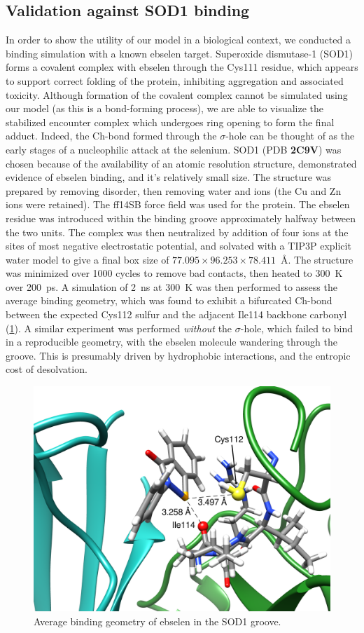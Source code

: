 \begin{refsection}
\subsection{Validation against SOD1 binding}
In order to show the utility of our model in a biological context, we conducted a binding simulation with a known ebselen target.
Superoxide dismutase-1 (SOD1) forms a covalent complex with ebselen through the Cys111 residue, which appears to support correct folding of the protein, inhibiting aggregation and associated toxicity.\autocite{Capper2018}
Although formation of the covalent complex cannot be simulated using our model (as this is a bond-forming process), we are able to visualize the stabilized encounter complex which undergoes ring opening to form the final adduct.
Indeed, the Ch-bond formed through the $ \sigma $-hole can be thought of as the early stages of a nucleophilic attack at the selenium.\autocite{Thomas2015}
SOD1 (PDB \textbf{2C9V}) was chosen because of the availability of an atomic resolution structure, demonstrated evidence of ebselen binding, and it's relatively small size.\autocite{Capper2018,Strange2006}
The structure was prepared by removing disorder, then removing water and ions (the Cu and Zn ions were retained).
The ff14SB force field was used for the protein.
The ebselen residue was introduced within the binding groove approximately halfway between the two units.
The complex was then neutralized by addition of four  ions at the sites of most negative electrostatic potential, and solvated with a TIP3P explicit water model to give a final box size of $ 77.095\times 96.253\times 78.411 $~\AA.\@
The structure was minimized over 1000 cycles to remove bad contacts, then heated to 300~K over 200~ps.
A simulation of 2~ns at 300~K was then performed to assess the average binding geometry, which was found to exhibit a bifurcated Ch-bond between the expected Cys112 sulfur and the adjacent Ile114 backbone carbonyl (\cref{fig:sod1-ebs}).
A similar experiment was performed \emph{without} the $ \sigma $-hole, which failed to bind in a reproducible geometry, with the ebselen molecule wandering through the groove.
This is presumably driven by hydrophobic interactions, and the entropic cost of desolvation.

\begin{figure}
    \centering
    \includegraphics[width=0.75\linewidth]{Figures/bifurcated-chbond.png}
    \caption{Average binding geometry of ebselen in the SOD1 groove.}\label{fig:sod1-ebs}
\end{figure}


\end{refsection}
